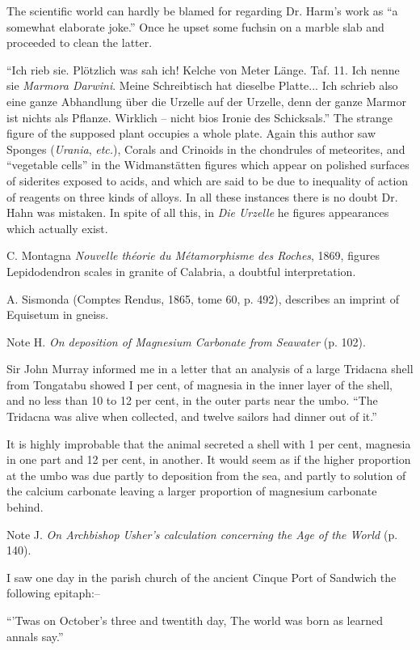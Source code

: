 \documentclass[a4paper, 12pt, oneside]{article}
\begin{document}
The scientific world can hardly be blamed for regarding Dr. Harm's work as ``a somewhat elaborate joke.'' Once he upset some fuchsin on a marble slab and proceeded to clean the latter.

``Ich rieb sie. Plötzlich was sah ich! Kelche von Meter Länge. Taf. 11. Ich nenne sie \emph{Marmora Darwini}. Meine Schreibtisch hat dieselbe Platte... Ich schrieb also eine ganze Abhandlung über die Urzelle auf der Urzelle, denn der ganze Marmor ist nichts als Pflanze. Wirklich -- nicht bios Ironie des Schicksals.'' The strange figure of the supposed plant occupies a whole plate. Again this author saw Sponges (\emph{Urania}, \emph{etc.}), Corals and Crinoids in the chondrules of meteorites, and ``vegetable cells'' in the Widmanstätten figures which appear on polished surfaces of siderites exposed to acids, and which are said to be due to inequality of action of reagents on three kinds of alloys. In all these instances there is no doubt Dr. Hahn was mistaken. In spite of all this, in \emph{Die Urzelle} he figures appearances which actually exist.

C. Montagna \emph{Nouvelle théorie du Métamorphisme des Roches}, 1869, figures Lepidodendron scales in granite of Calabria, a doubtful interpretation.

A. Sismonda (Comptes Rendus, 1865, tome 60, p. 492), describes an imprint of Equisetum in gneiss.

Note H. \emph{On deposition of Magnesium Carbonate from Seawater} (p. 102).

Sir John Murray informed me in a letter that an analysis of a large Tridacna shell from Tongatabu showed I per cent, of magnesia in the inner layer of the shell, and no less than 10 to 12 per cent, in the outer parts near the umbo. ``The Tridacna was alive when collected, and twelve sailors had dinner out of it.''

It is highly improbable that the animal secreted a shell with 1 per cent, magnesia in one part and 12 per cent, in another. It would seem as if the higher proportion at the umbo was due partly to deposition from the sea, and partly to solution of the calcium carbonate leaving a larger proportion of magnesium carbonate behind.

Note J. \emph{On Archbishop Usher's calculation concerning the Age of the World} (p. 140).

I saw one day in the parish church of the ancient Cinque Port of Sandwich the following epitaph:--

``'Twas on October's three and twentith day,  
The world was born as learned annals say.''
\end{document}
